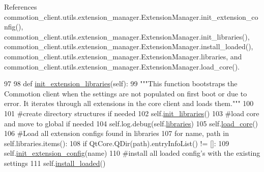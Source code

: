 References commotion\-\_\-client.\-utils.\-extension\-\_\-manager.\-Extension\-Manager.\-init\-\_\-extension\-\_\-config(), commotion\-\_\-client.\-utils.\-extension\-\_\-manager.\-Extension\-Manager.\-init\-\_\-libraries(), commotion\-\_\-client.\-utils.\-extension\-\_\-manager.\-Extension\-Manager.\-install\-\_\-loaded(), commotion\-\_\-client.\-utils.\-extension\-\_\-manager.\-Extension\-Manager.\-libraries, and commotion\-\_\-client.\-utils.\-extension\-\_\-manager.\-Extension\-Manager.\-load\-\_\-core().


\begin{DoxyCode}
97 
98     \textcolor{keyword}{def }\hyperlink{classcommotion__client_1_1utils_1_1extension__manager_1_1ExtensionManager_a5a94323a3528a6af3bf009eb302fa729}{init\_extension\_libraries}(self):
99         \textcolor{stringliteral}{"""This function bootstraps the Commotion client when the settings are not populated on first boot
       or due to error. It iterates through all extensions in the core client and loads them."""}
100         
101         \textcolor{comment}{#create directory structures if needed}
102         self.\hyperlink{classcommotion__client_1_1utils_1_1extension__manager_1_1ExtensionManager_a2edb9c39e0b8e5143c245089170182a3}{init\_libraries}()
103         \textcolor{comment}{#load core and move to global if needed}
104         self.log.debug(self.\hyperlink{classcommotion__client_1_1utils_1_1extension__manager_1_1ExtensionManager_a28e035496b4d544179f934b3c401c0c1}{libraries})
105         self.\hyperlink{classcommotion__client_1_1utils_1_1extension__manager_1_1ExtensionManager_a98f5f3c261f083885a9b0528dcdafd34}{load\_core}()
106         \textcolor{comment}{#Load all extension configs found in libraries}
107         \textcolor{keywordflow}{for} name, path \textcolor{keywordflow}{in} self.libraries.items():
108             \textcolor{keywordflow}{if} QtCore.QDir(path).entryInfoList() != []:
109                 self.\hyperlink{classcommotion__client_1_1utils_1_1extension__manager_1_1ExtensionManager_ae751a1b407e33af012d41ec44f2ce717}{init\_extension\_config}(name)
110         \textcolor{comment}{#install all loaded config's with the existing settings}
111         self.\hyperlink{classcommotion__client_1_1utils_1_1extension__manager_1_1ExtensionManager_a58bcb83cefe458d4affcb185785694c6}{install\_loaded}()

\end{DoxyCode}
